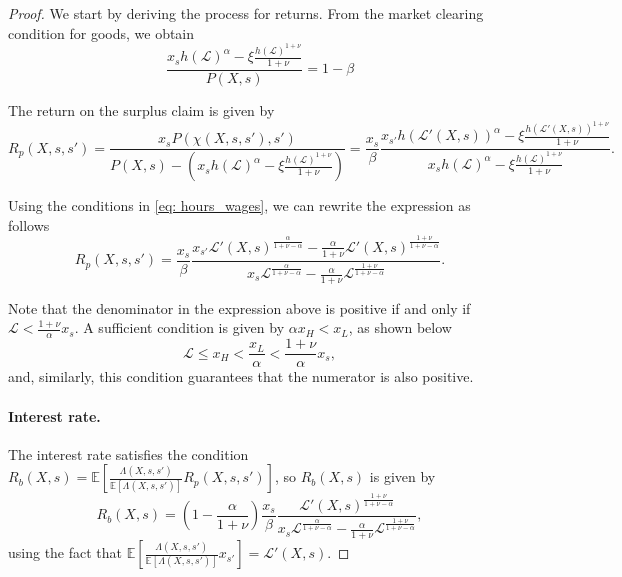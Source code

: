\begin{proof} We start by deriving the process for returns.  From the market clearing condition for goods, we obtain
\begin{equation}
    \frac{x_s h(\mathcal{L})^\alpha - \xi \frac{h(\mathcal{L})^{1+\nu}}{1+\nu} }{P(X,s)} = 1-\beta
\end{equation}

The return on the surplus claim is given by
\begin{equation}
    R_{p}(X,s,s') = \frac{x_s P(\chi(X,s,s'),s')}{P(X,s) - \left( x_s h(\mathcal{L})^\alpha - \xi \frac{h(\mathcal{L})^{1+\nu}}{1+\nu}\right)} =
    \frac{x_s}{\beta} \frac{x_{s'} h(\mathcal{L}'(X,s))^\alpha - \xi \frac{h(\mathcal{L}'(X,s))^{1+\nu}}{1+\nu} }{x_{s} h(\mathcal{L})^\alpha - \xi \frac{h(\mathcal{L})^{1+\nu}}{1+\nu}}.
\end{equation}

Using the conditions in \eqref{eq: hours_wages}, we can rewrite the expression as follows
\begin{equation}
    R_{p}(X,s,s') = \frac{x_s}{\beta} \frac{x_{s'} \mathcal{L}'(X,s)^\frac{\alpha}{1+\nu-\alpha} - \frac{\alpha}{1+\nu} \mathcal{L}'(X,s)^{\frac{1+\nu}{1+\nu-\alpha}}}{x_{s} \mathcal{L}^\frac{\alpha}{1+\nu-\alpha} - \frac{\alpha}{1+\nu} \mathcal{L}^{\frac{1+\nu}{1+\nu-\alpha}} }.
\end{equation}

Note that the denominator in the expression above is positive if and only if $\mathcal{L} < \frac{1+\nu}{\alpha} x_s$. 
A sufficient condition is given by $\alpha x_H < x_L$, as shown below
\begin{equation}
    \mathcal{L} \leq x_H < \frac{x_L}{\alpha} < \frac{1+\nu}{\alpha} x_s,
\end{equation}
and, similarly, this condition guarantees that the numerator is also positive.

\paragraph{Interest rate.} The interest rate satisfies the condition $R_b(X,s) = \mathbb{E}\left[ \frac{\Lambda(X,s,s')}{\mathbb{E}[\Lambda(X,s,s')]} R_p(X,s,s') \right]$, so $R_b(X,s)$ is given by 
\begin{equation}
    R_{b}(X,s) = \left(1 - \frac{\alpha}{1+\nu}\right)\frac{x_s}{\beta} \frac{ \mathcal{L}'(X,s)^{\frac{1+\nu}{1+\nu-\alpha}}}{x_{s} \mathcal{L}^\frac{\alpha}{1+\nu-\alpha} - \frac{\alpha}{1+\nu} \mathcal{L}^{\frac{1+\nu}{1+\nu-\alpha}} },
\end{equation}
using the fact that $\mathbb{E}\left[ \frac{\Lambda(X,s,s')}{\mathbb{E}[\Lambda(X,s,s')]} x_{s'} \right] = \mathcal{L}'(X,s)$.


\end{proof}
